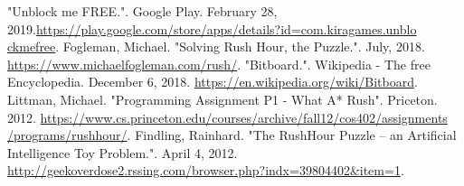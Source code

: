 \documentclass[conference]{IEEEtran}
\begin{document}
\begin{thebibliography}{00}
    
 "Unblock me FREE.". Google Play. February 28, 2019.\href{https://play.google.com/store/apps/details?id=com.kiragames.unblockmefree}{https://play.google.com/store/apps/details?id=com.kiragames.unblo\\ckmefree}.
 Fogleman, Michael. "Solving Rush Hour, the Puzzle.". July, 2018. \href{https://www.michaelfogleman.com/rush/}{https://www.michaelfogleman.com/rush/}.
 "Bitboard.". Wikipedia - The free Encyclopedia. December 6, 2018. \href{https://en.wikipedia.org/wiki/Bitboard}{https://en.wikipedia.org/wiki/Bitboard}.
 Littman, Michael. "Programming Assignment P1 - What A* Rush". Priceton. 2012. \href{https://www.cs.princeton.edu/courses/archive/fall12/cos402/assignments/programs/rushhour/}{https://www.cs.princeton.edu/courses/archive/fall12/cos402/assignments\\/programs/rushhour/}.
 Findling, Rainhard. "The RushHour Puzzle – an Artificial Intelligence Toy Problem.". April 4, 2012. \href{http://geekoverdose2.rssing.com/browser.php?indx=39804402\&item=1}{http://geekoverdose2.rssing.com/browser.php?indx=39804402\&item=1}.
\end{thebibliography}
\end{document}
